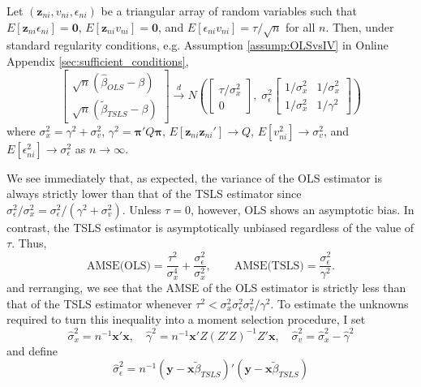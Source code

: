 \begin{thm}
	\label{thm:OLSvsIV} 
  Let $(\mathbf{z}_{ni}, v_{ni}, \epsilon_{ni})$ be a triangular array of random variables such that $E[\mathbf{z}_{ni} \epsilon_{ni}]=\mathbf{0}$, $E[\mathbf{z}_{ni} v_{ni}]=\mathbf{0}$, and $E[\epsilon_{ni}v_{ni}] = \tau/\sqrt{n}$ for all $n$. Then, under standard regularity conditions, e.g. Assumption \ref{assump:OLSvsIV} in Online Appendix \ref{sec:sufficient_conditions}, 
	$$
\left[
\begin{array}{c}
  \sqrt{n}(\widehat{\beta}_{OLS} - \beta) \\
  \sqrt{n}(\widetilde{\beta}_{TSLS} - \beta)
\end{array}
\right] \overset{d}{\rightarrow}
N\left(
\left[
\begin{array}{c}
\tau/\sigma_x^2 \\ 
0
\end{array}
\right],\;
\sigma_\epsilon^2 \left[ \begin{array}{cc}
  1/\sigma_x^2 & 1/\sigma_x^2\\
  1/\sigma_x^2 & 1/\gamma^2 
  \end{array}\right]
  \right)
$$
where $\sigma_x^2 = \gamma^2 + \sigma_v^2$, $\gamma^2 = \boldsymbol{\pi}'Q \boldsymbol{\pi}$, $E[\mathbf{z}_{ni} \mathbf{z}_{ni}'] \rightarrow Q$, $E[v_{ni}^2]\rightarrow \sigma_v^2$, and $E[\epsilon_{ni}^2] \rightarrow \sigma_\epsilon^2$ as $n\rightarrow \infty$.
\end{thm}
We see immediately that, as expected, the variance of the OLS estimator is always strictly lower than that of the TSLS estimator since $\sigma^2_\epsilon/\sigma_x^2 = \sigma^2_\epsilon/(\gamma^2 + \sigma_v^2)$. 
Unless $\tau = 0$, however, OLS shows an asymptotic bias. 
In contrast, the TSLS estimator is asymptotically unbiased regardless of the value of $\tau$.  
Thus,
$$\mbox{AMSE(OLS)} = \frac{\tau^2}{\sigma_x^4} + \frac{\sigma_\epsilon^2}{\sigma_x^2},\quad \quad
  \mbox{AMSE(TSLS)} = \frac{\sigma_\epsilon^2}{\gamma^2}.$$
 and rerranging, we see that the AMSE of the OLS estimator is strictly less than that of the TSLS estimator whenever $\tau^2  < \sigma_x^2 \sigma_\epsilon^2\sigma_v^2/\gamma^2$. 
To estimate the unknowns required to turn this inequality into a moment selection procedure, I set 
  $$\widehat{\sigma}_x^2 = n^{-1}\mathbf{x}'\mathbf{x}, \quad \widehat{\gamma}^2 = n^{-1}\mathbf{x}'Z(Z'Z)^{-1}Z'\mathbf{x}, \quad \widehat{\sigma}_v^2 =  \widehat{\sigma}_x^2 - \widehat{\gamma}^2$$
and define
$$\widehat{\sigma}_\epsilon^2 = n^{-1}\left(\textbf{y} - \textbf{x}\widetilde{\beta}_{TSLS} \right)'\left(\textbf{y} - \textbf{x}\widetilde{\beta}_{TSLS} \right)$$
